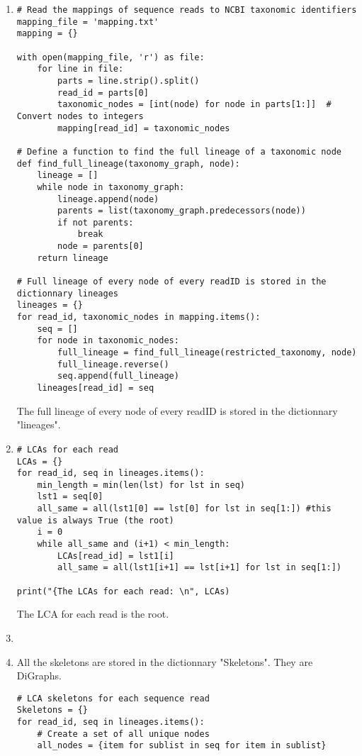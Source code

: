 \documentclass[12 pt,a4paper]{article}
\begin{document}
\begin{enumerate}
\item
{}
\begin{verbatim}
# Read the mappings of sequence reads to NCBI taxonomic identifiers
mapping_file = 'mapping.txt'
mapping = {}

with open(mapping_file, 'r') as file:
    for line in file:
        parts = line.strip().split()
        read_id = parts[0]
        taxonomic_nodes = [int(node) for node in parts[1:]]  # Convert nodes to integers
        mapping[read_id] = taxonomic_nodes

# Define a function to find the full lineage of a taxonomic node
def find_full_lineage(taxonomy_graph, node):
    lineage = []
    while node in taxonomy_graph:
        lineage.append(node)
        parents = list(taxonomy_graph.predecessors(node))
        if not parents:
            break
        node = parents[0]
    return lineage

# Full lineage of every node of every readID is stored in the dictionnary lineages
lineages = {}
for read_id, taxonomic_nodes in mapping.items():
    seq = []
    for node in taxonomic_nodes:
        full_lineage = find_full_lineage(restricted_taxonomy, node)
        full_lineage.reverse()
        seq.append(full_lineage)
    lineages[read_id] = seq
\end{verbatim}
The full lineage of every node of every readID is stored in the dictionnary "lineages".
\item
\begin{verbatim}
# LCAs for each read
LCAs = {}
for read_id, seq in lineages.items():
    min_length = min(len(lst) for lst in seq) 
    lst1 = seq[0]
    all_same = all(lst1[0] == lst[0] for lst in seq[1:]) #this value is always True (the root)
    i = 0
    while all_same and (i+1) < min_length:
        LCAs[read_id] = lst1[i]
        all_same = all(lst1[i+1] == lst[i+1] for lst in seq[1:])

print("{The LCAs for each read: \n", LCAs)
\end{verbatim}
The LCA for each read is the root.
\item 
\item 
All the skeletons are stored in the dictionnary "Skeletons". They are DiGraphs.
\begin{verbatim}
# LCA skeletons for each sequence read
Skeletons = {}
for read_id, seq in lineages.items():
    # Create a set of all unique nodes
    all_nodes = {item for sublist in seq for item in sublist}


\end{verbatim}
\end{enumerate}
\end{document}

